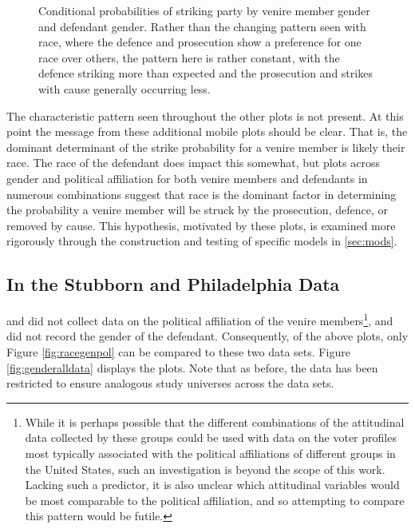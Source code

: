 \begin{figure}[h!]
  \centering
  \caption[Strikes by Gender and Defendant Gender (Sunshine)]
  {\footnotesize Conditional probabilities of striking party by venire member gender and defendant gender. Rather than the changing
    pattern seen with race, where the defence and prosecution show a preference for one race over others, the pattern here is
    rather constant, with the defence striking more than expected and
    the prosecution and strikes with cause generally occurring
    less.} \label{fig:gengen}
\end{figure}

The characteristic pattern seen throughout the other plots is not present. At this point the message from these additional mobile
plots should be clear. That is, the dominant determinant of the strike probability for a venire member is likely their race. The
race of the defendant does impact this somewhat, but plots across gender and political affiliation for both venire members and
defendants in numerous combinations suggest that race is the dominant factor in determining the probability a venire member will
be struck by the prosecution, defence, or removed by cause. This hypothesis, motivated by these plots, is examined more rigorously
through the construction and testing of specific models in \ref{sec:mods}.

\subsection{In the Stubborn and Philadelphia Data}

\cite{StubbornLegacy} and \cite{PerempChalMurder} did not collect data on the political affiliation of the venire
members\footnote{While it is perhaps possible that the different combinations of the attitudinal data collected by these groups
  could be used with data on the voter profiles most typically associated with the political affiliations of different groups in
  the United States, such an investigation is beyond the scope of this work. Lacking such a predictor, it is also unclear which
  attitudinal variables would be most comparable to the political affiliation, and so attempting to compare this pattern would be
  futile.}, and \cite{StubbornLegacy} did not record the gender of the defendant. Consequently, of the above plots, only Figure
\ref{fig:racegenpol} can be compared to these two data sets. Figure \ref{fig:genderalldata} displays the plots. Note that as
before, the data has been restricted to ensure analogous study universes across the data sets.

